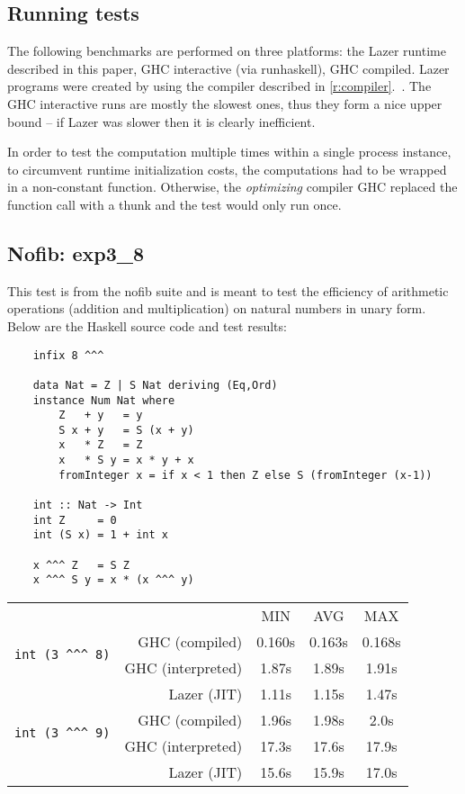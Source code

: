 \documentclass[en]{pracamgr}
\newcommand{\myref}[1]{\ref{#1}.~\textit{\nameref{#1}}}
\begin{document}
\subsection{Running tests}

The following benchmarks are performed on three platforms:
the Lazer runtime described in this paper,
GHC interactive (via runhaskell),
GHC compiled.
Lazer programs were created by using the compiler described in
\myref{r:compiler}.
The GHC interactive runs are mostly the slowest ones,
thus they form a nice upper bound -- if Lazer was slower
then it is clearly inefficient.

In order to test the computation multiple times
within a single process instance, to circumvent
runtime initialization costs, the computations had to be
wrapped in a non-constant function. Otherwise,
the \textit{optimizing} compiler GHC replaced the
function call with a thunk and the test would only run once.

\subsection{Nofib: exp3\_8}

This test is from the nofib suite and is meant to test
the efficiency of arithmetic operations (addition and multiplication)
on natural numbers in unary form. Below are the Haskell source
code and test results:

\begin{verbatim}
    infix 8 ^^^

    data Nat = Z | S Nat deriving (Eq,Ord)
    instance Num Nat where
        Z   + y   = y
        S x + y   = S (x + y)
        x   * Z   = Z
        x   * S y = x * y + x
        fromInteger x = if x < 1 then Z else S (fromInteger (x-1))

    int :: Nat -> Int
    int Z     = 0
    int (S x) = 1 + int x

    x ^^^ Z   = S Z
    x ^^^ S y = x * (x ^^^ y)
\end{verbatim}

\begin{center}
\begin{tabular}{c r c c c}
    & & MIN & AVG & MAX \\
    \cline{3-5}

    \multirow{2}{*}{\texttt{int (3 \^{}\^{}\^{} 8)}}
    & GHC (compiled)& 0.160s & 0.163s & 0.168s \\
    & GHC (interpreted)& 1.87s & 1.89s & 1.91s \\
    & Lazer (JIT)& 1.11s & 1.15s & 1.47s \\
    \cline{2-5}

    \multirow{2}{*}{\texttt{int (3 \^{}\^{}\^{} 9)}}
    & GHC (compiled)& 1.96s & 1.98s & 2.0s \\
    & GHC (interpreted)& 17.3s & 17.6s & 17.9s \\
    & Lazer (JIT)& 15.6s & 15.9s & 17.0s \\
\end{tabular}
\end{center}
\end{document}
